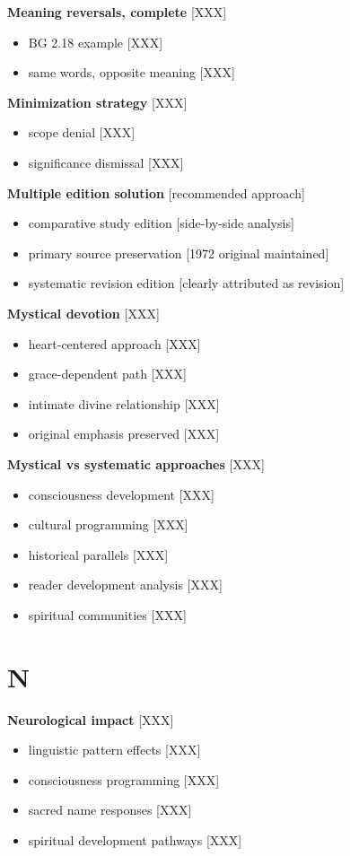 \documentclass[11pt,twoside]{book}
\begin{document}
\textbf{\textbf{Meaning reversals, complete}} {[}XXX]
\begin{itemize}
\item BG 2.18 example [XXX]
\item same words, opposite meaning [XXX]
\end{itemize}

\textbf{\textbf{Minimization strategy}} {[}XXX]
\begin{itemize}
\item scope denial [XXX]
\item significance dismissal [XXX]
\end{itemize}

\textbf{\textbf{Multiple edition solution}} {[}recommended approach]
\begin{itemize}
\item comparative study edition [side-by-side analysis]
\item primary source preservation [1972 original maintained]
\item systematic revision edition [clearly attributed as revision]
\end{itemize}

\textbf{\textbf{Mystical devotion}} {[}XXX]
\begin{itemize}
\item heart-centered approach [XXX]
\item grace-dependent path [XXX]
\item intimate divine relationship [XXX]
\item original emphasis preserved [XXX]
\end{itemize}

\textbf{\textbf{Mystical vs systematic approaches}} {[}XXX]
\begin{itemize}
\item consciousness development [XXX]
\item cultural programming [XXX]
\item historical parallels [XXX]
\item reader development analysis [XXX]
\item spiritual communities [XXX]
\end{itemize}
\section*{N}
\label{sec:org5618ebf}

\textbf{\textbf{Neurological impact}} {[}XXX]
\begin{itemize}
\item linguistic pattern effects [XXX]
\item consciousness programming [XXX]
\item sacred name responses [XXX]
\item spiritual development pathways [XXX]
\end{itemize}
\end{document}
